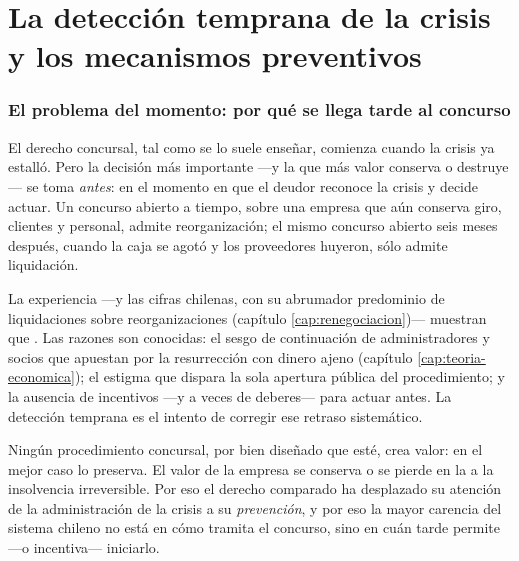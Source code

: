 \chapter{La detección temprana de la crisis y los mecanismos preventivos}
\label{cap:deteccion-temprana}


\bloqueTeorico

\subsection{El problema del momento: por qué se llega tarde al concurso}

El derecho concursal, tal como se lo suele enseñar, comienza cuando la crisis ya estalló. Pero la
decisión más importante ---y la que más valor conserva o destruye--- se toma \emph{antes}: en el
momento en que el deudor reconoce la crisis y decide actuar. Un concurso abierto a tiempo, sobre una
empresa que aún conserva giro, clientes y personal, admite reorganización; el mismo concurso abierto
seis meses después, cuando la caja se agotó y los proveedores huyeron, sólo admite liquidación.

La experiencia ---y las cifras chilenas, con su abrumador predominio de liquidaciones sobre
reorganizaciones (capítulo \ref{cap:renegociacion})--- muestran que . Las
razones son conocidas: el sesgo de continuación de administradores y socios que apuestan por la
resurrección con dinero ajeno (capítulo \ref{cap:teoria-economica}); el estigma que dispara la sola
apertura pública del procedimiento; y la ausencia de incentivos ---y a veces de deberes--- para
actuar antes. La detección temprana es el intento de corregir ese retraso sistemático.

\begin{foco}
Ningún procedimiento concursal, por bien diseñado que esté, crea valor: en el mejor caso lo
preserva. El valor de la empresa se conserva o se pierde en la  a la
insolvencia irreversible. Por eso el derecho comparado ha desplazado su atención de la
administración de la crisis a su \emph{prevención}, y por eso la mayor carencia del sistema chileno
no está en cómo tramita el concurso, sino en cuán tarde permite ---o incentiva--- iniciarlo.
\end{foco}

